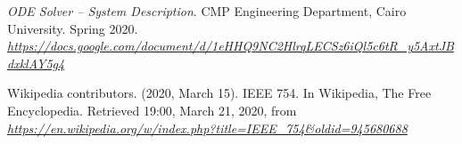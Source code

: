 \documentclass[12pt]{report}
\begin{document}
\begin{thebibliography}{9}
    \textit{ODE Solver -- System Description}. CMP Engineering Department, Cairo University. Spring 2020.
    \\\textit{\url{https://docs.google.com/document/d/1eHHQ9NC2HlrqLECSz6iQl5c6tR_y5AxtJBdxklAY5g4}}

    Wikipedia contributors. (2020, March 15). IEEE 754. In Wikipedia, The Free Encyclopedia. Retrieved 19:00, March 21, 2020, from \\\textit{\url{https://en.wikipedia.org/w/index.php?title=IEEE_754&oldid=945680688}}
\end{thebibliography}
\end{document}
